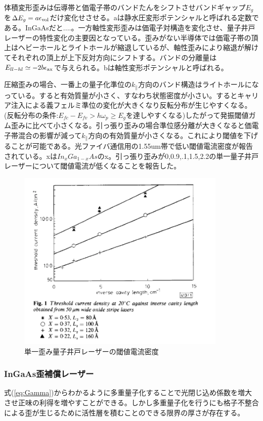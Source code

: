 体積変形歪みは伝導帯と価電子帯のバンドたんをシフトさせバンドギャップ$E_{g}$を$\Delta E_{g}=a\epsilon_{\rm{vol}}$だけ変化せさせる。aは静水圧変形ポテンシャルと呼ばれる定数である。InGaAsだと....。一方軸性変形歪みは価電子対構造を変化させ、量子井戸レーザーの特性変化の主要因となっている。歪みがない半導体では価電子帯の頂上はヘビーホールとライトホールが縮退しているが、軸性歪みにより縮退が解けてそれぞれの頂上が上下反対方向にシフトする。バンドの分離量は$E_{ll-hl}\simeq -2b\epsilon_{\rm{ax}}$で与えられる。bは軸性変形ポテンシャルと呼ばれる。



圧縮歪みの場合、一番上の量子化準位の$k_{\|}$方向のバンド構造はライトホールになっている。すると有効質量が小さく、すなわち状態密度が小さい。するとキャリア注入による義フェルミ準位の変化が大きくなり反転分布が生じやすくなる。(反転分布の条件:$E_{fc}-E_{fv}>h\omega _{p}\geq E_{g}$を達しやすくなる)したがって発振閾値ガム歪みに比べて小さくなる。引っ張り歪みの場合準位感分離が大きくなると価電子帯混合の影響が減って$k_{\|}$方向の有効質量が小さくなる。これにより閾値を下げることが可能である。光ファイバ通信用の1.55um帯で低い閾値電流密度が報告されている。\cite{ref_thijs}xは$In_{x}Ga_{1-x}As$のx。引っ張り歪みが0,0.9,.1,1.5,2.2の単一量子井戸レーザーについて閾値電流が低くなることを報告した。

\begin{figure}[h]
	\centering
	\includegraphics[width=10cm]{figure/fig_1_1_lattice_strain_Ith.png}
	\caption{単一歪み量子井戸レーザーの閾値電流密度\cite{ref_thijs}}
	\label{fig:fig_latice_strain_Ith}
\end{figure}

\clearpage
\subsubsection{InGaAs歪補償レーザー}
式(\ref{eq:Gamma})からわかるように多重量子化することで光閉じ込め係数を増大させ正味の利得を増やすことができる。しかし多重量子化を行うにも格子不整合による歪が生じるために活性層を積むことのできる限界の厚さが存在する。


